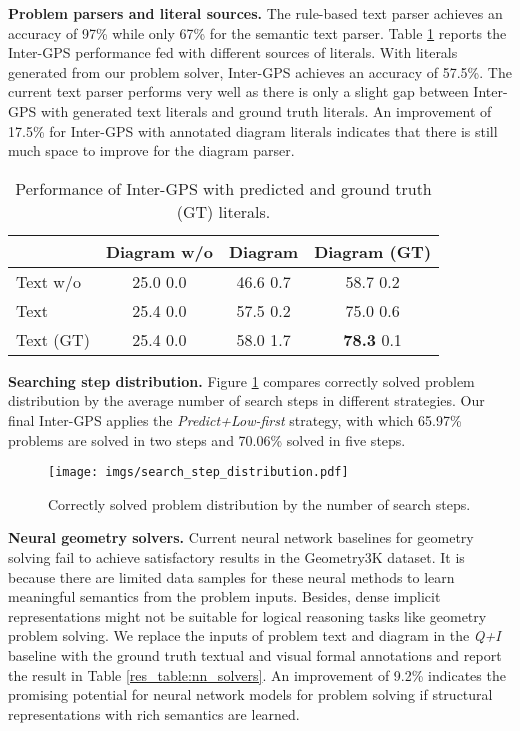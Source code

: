 \documentclass[11pt,a4paper]{article}
\begin{document}
\noindent \textbf{Problem parsers and literal sources.} The rule-based text parser achieves an accuracy of 97\% while only 67\% for the semantic text parser. Table \ref{res_table:literals} reports the Inter-GPS performance fed with different sources of literals. With literals generated from our problem solver, Inter-GPS achieves an accuracy of 57.5\%.  The current text parser performs very well as there is only a slight gap between Inter-GPS with generated text literals and ground truth literals. An improvement of 17.5\% for Inter-GPS with annotated diagram literals indicates that there is still much space to improve for the diagram parser.

\begin{table}[ht]
\centering 
\setlength{\tabcolsep}{3pt}
\small 
\begin{tabular}{l|c|c|c}
	\hline
	 & Diagram w/o & Diagram & Diagram (GT)  \\
	 \hline
	 Text w/o & 25.0  0.0 & 46.6  0.7 & 58.7  0.2 \\
	 \hline
	 Text  & 25.4  0.0 & 57.5  0.2 & 75.0  0.6 \\
	 \hline
	 Text (GT) & 25.4  0.0  & 58.0  1.7 & \textbf{78.3}  0.1 \\
	\hline
\end{tabular}
\caption{Performance of Inter-GPS with predicted and ground truth (GT) literals.}
\label{res_table:literals}
\end{table}

\noindent \textbf{Searching step distribution.} Figure \ref{fig:step_dis} compares correctly solved problem distribution by the average number of search steps in different strategies. Our final Inter-GPS applies the \textit{Predict+Low-first} strategy, with which 65.97\% problems are solved in two steps and 70.06\% solved in five steps.

\begin{figure}[ht]
    \centering 
    \texttt{[image: imgs/search\_step\_distribution.pdf]}
\caption{Correctly solved problem distribution by the number of search steps.}
\label{fig:step_dis}
\end{figure}


\noindent \textbf{Neural geometry solvers.} Current neural network baselines for geometry solving fail to achieve satisfactory results in the Geometry3K dataset. It is because there are limited data samples for these neural methods to learn meaningful semantics from the problem inputs. Besides, dense implicit representations might not be suitable for logical reasoning tasks like geometry problem solving. We replace the inputs of problem text and diagram in the \textit{Q+I} baseline with the ground truth textual and visual formal annotations and report the result in Table \ref{res_table:nn_solvers}. An improvement of 9.2\% indicates the promising potential for neural network models for problem solving if structural representations with rich semantics are learned.
\end{document}
